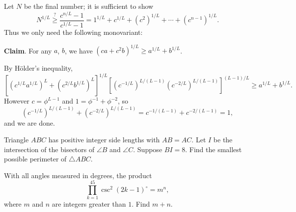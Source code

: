 \begin{solution}[name={Solution by TheUltimate123}]
	Let $N$ be the final number; it is sufficient to show\[N^{1/L}\stackrel?\ge\frac{c^{n/L}-1}{c^{1/L}-1}=1^{1/L}+c^{1/L}+\left(c^2\right)^{1/L}+\cdots+\left(c^{n-1}\right)^{1/L}.\]Thus we only need the following monovariant:
	
	\textbf{Claim}. For any $a$, $b$, we have $\left(ca+c^2b\right)^{1/L}\ge a^{1/L}+b^{1/L}$.
	
	By H\"older's inequality,\[ \left[\left(c^{1/L}a^{1/L}\right)^L+\left(c^{2/L}b^{1/L}\right)^L\right]^{1/L}\left[\left(c^{-1/L}\right)^{L/(L-1)}\left(c^{-2/L}\right)^{L/(L-1)}\right]^{(L-1)/L}\ge a^{1/L}+b^{1/L}.\]However $c=\phi^{L-1}$ and $1=\phi^{-1}+\phi^{-2}$, so\[\left(c^{-1/L}\right)^{L/(L-1)}+\left(c^{-2/L}\right)^{L/(L-1)}=c^{-1/(L-1)}+c^{-2/(L-1)}=1,\]and we are done.
\end{solution}










\begin{question}[name={2015 AIME I, \href{https://artofproblemsolving.com/community/c4p4622260}{Problem 11}}]
	Triangle $ABC$ has positive integer side lengths with $AB=AC$. Let $I$ be the intersection of the bisectors of $\angle B$ and $\angle C$. Suppose $BI=8$. Find the smallest possible perimeter of $\triangle ABC$.
\end{question}


%	













\begin{question}[name={2015 AIME I, \href{https://artofproblemsolving.com/community/c4p4622272}{Problem 13}}]
	With all angles measured in degrees, the product $$\prod_{k=1}^{45} \csc^2(2k-1)^\circ=m^n,$$ where $m$ and $n$ are integers greater than $1$. Find $m+n$.
\end{question}


%	













